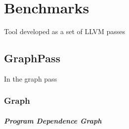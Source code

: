 \chapter{Benchmarks}

Tool developed as a set of LLVM passes

\section{GraphPass} 
In the graph pass

\subsection{Graph}

\paragraph{Program Dependence Graph}

